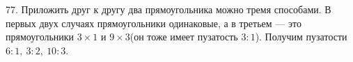 \documentclass[12pt]{article}
\begin{document}
\begin{center}
\begin{figure}[ht!]
\end{figure}
\end{center}
77. Приложить друг к другу два прямоугольника можно тремя способами. В первых двух случаях прямоугольники одинаковые, а в третьем --- это прямоугольники $3\times1$ и $9\times3$(он тоже имеет пузатость $3:1$). Получим пузатости $6:1,\ 3:2,\ 10:3.$
\begin{center}
\begin{figure}[ht!]
\end{figure}
\end{center}
\end{document}
